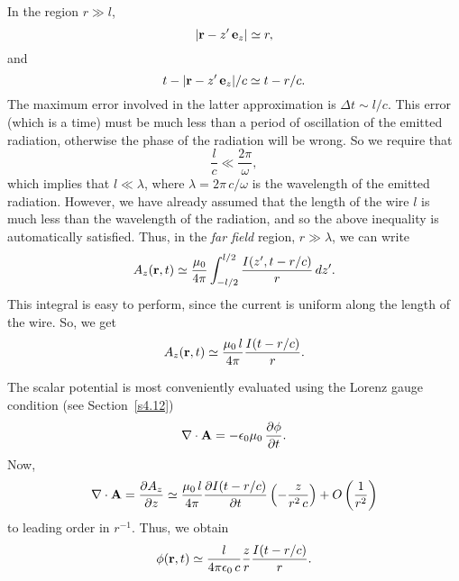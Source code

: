 In the region $r\gg l$,
\begin{equation}
|{\bf r} - z' \,{\bf e}_z| \simeq r,
\end{equation}
and
\begin{equation}
t - |{\bf r} - z' \,{\bf e}_z|/c \simeq t - r/c.
\end{equation}
The maximum error involved in the latter approximation is $\Delta t \sim l/c$. This error (which is
a time) must be much less than a period of oscillation of the emitted radiation,
otherwise the phase of the radiation will be wrong. So we require that
\begin{equation}
\frac{l}{c} \ll \frac{2\pi}{\omega},
\end{equation}
which implies that $l\ll \lambda$,
 where $\lambda = 2\pi\, c/\omega$ is the wavelength of the emitted radiation.
However, 
we have already assumed that the length of the wire $l$ is much less than the wavelength of the
radiation, and so the above inequality is automatically
 satisfied. Thus, in the {\em far field}\/ region, $r\gg \lambda$, we can
write
\begin{equation}
A_z ({\bf r}, t) \simeq \frac{\mu_0}{4\pi} \int_{-l/2}^{l/2} \frac{I(z', t -r/c)}{r}\,dz'.
\end{equation}
This integral is easy to perform, since the current is uniform along the length of the wire. 
So, we get
\begin{equation}\label{e9.10}
A_z({\bf r}, t) \simeq \frac{\mu_0 \,l}{4\pi} \frac{I(t-r/c)}{r}.
\end{equation}

The scalar potential is most conveniently evaluated using the Lorenz gauge condition (see Section~\ref{s4.12})
\begin{equation}
\nabla\cdot {\bf A} = - \epsilon_0 \mu_0\, \frac{\partial\phi}{\partial t}.
\end{equation}
Now,
\begin{equation}
\nabla\cdot{\bf A} =\frac{\partial A_z}{\partial z} \simeq \frac{\mu_0 \,l}{4\pi}
\frac{\partial I(t-r/c)}{\partial t} \left(-\frac{z}{r^2 \,c}\right) +O\left(
\frac{1}{r^2}\right)
\end{equation}
to leading order in $r^{-1}$. Thus, we obtain
\begin{equation}\label{e9.13}
\phi({\bf r}, t) \simeq \frac{l}{4\pi\epsilon_0\, c} \frac{z}{r} \frac{I(t-r/c)}{r}.
\end{equation}

